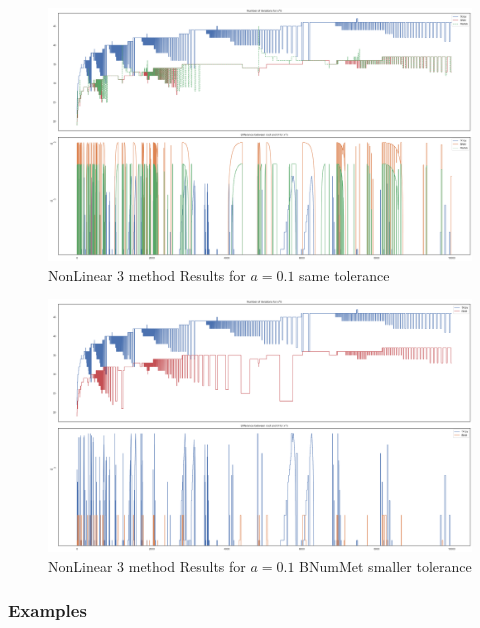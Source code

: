 \begin{figure}
    \centering
    \includegraphics[width=\textwidth]{Include/Images/Thesis/Analysis of Solutions/NonLinear AS/NonLinear 3 method Results a-0.1.png}
    \caption{NonLinear 3 method Results for $a=0.1$ same tolerance}
    \label{fig:NonLinear 3 method Results for a=0.1 same tolerance}
\end{figure}

\begin{figure}
    \centering
    \includegraphics[width=\textwidth]{Include/Images/Thesis/Analysis of Solutions/NonLinear AS/NonLinear 3 method Results Small Tol Bnum a-0.1.png}
    \caption{NonLinear 3 method Results for $a=0.1$ BNumMet smaller tolerance}
    \label{fig:NonLinear 3 method Results for a=0.1 BNumMet smaller tolerance}
\end{figure}


\subsubsection{Examples}
	
